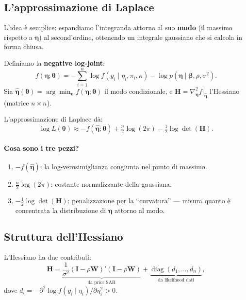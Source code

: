 \documentclass[12pt,a4paper]{article}
\newcommand{\bW}{\mathbf{W}}
\newcommand{\bI}{\mathbf{I}}
\DeclareMathOperator{\diag}{diag}
\begin{document}
\subsection{L'approssimazione di Laplace}

L'idea \`e semplice: espandiamo l'integranda attorno al suo \textbf{modo} (il massimo rispetto a $\boldsymbol{\eta}$) al second'ordine, ottenendo un integrale gaussiano che si calcola in forma chiusa.

Definiamo la \textbf{negative log-joint}:
\[
  f(\boldsymbol{\eta}; \boldsymbol{\theta}) =
  -\sum_{i=1}^{n} \log f(y_i \mid \eta_i, \pi_i, \kappa)
  - \log p(\boldsymbol{\eta} \mid \boldsymbol{\beta}, \rho, \sigma^2).
\]
Sia $\hat{\boldsymbol{\eta}}(\boldsymbol{\theta}) = \arg\min_{\boldsymbol{\eta}} f(\boldsymbol{\eta}; \boldsymbol{\theta})$ il modo condizionale, e $\mathbf{H} = \nabla^2_{\boldsymbol{\eta}} f\big|_{\hat{\boldsymbol{\eta}}}$ l'Hessiano (matrice $n \times n$).

L'approssimazione di Laplace d\`a:
\begin{equation}\label{eq:laplace}
  \log L(\boldsymbol{\theta}) \approx -f(\hat{\boldsymbol{\eta}}; \boldsymbol{\theta}) + \tfrac{n}{2}\log(2\pi) - \tfrac{1}{2}\log\det(\mathbf{H}).
\end{equation}

\paragraph{Cosa sono i tre pezzi?}
\begin{enumerate}
  \item $-f(\hat{\boldsymbol{\eta}})$: la log-verosimiglianza congiunta nel punto di massimo.
  \item $\frac{n}{2}\log(2\pi)$: costante normalizzante della gaussiana.
  \item $-\frac{1}{2}\log\det(\mathbf{H})$: penalizzazione per la ``curvatura'' --- misura quanto \`e concentrata la distribuzione di $\boldsymbol{\eta}$ attorno al modo.
\end{enumerate}

\subsection{Struttura dell'Hessiano}

L'Hessiano ha due contributi:
\[
  \mathbf{H} = \underbrace{\frac{1}{\sigma^2}(\bI - \rho\bW)'(\bI - \rho\bW)}_{\text{da prior SAR}} + \underbrace{\diag(d_1,\ldots,d_n)}_{\text{da likelihood dati}},
\]
dove $d_i = -\partial^2 \log f(y_i \mid \eta_i)/\partial\eta_i^2 > 0$.
\end{document}
